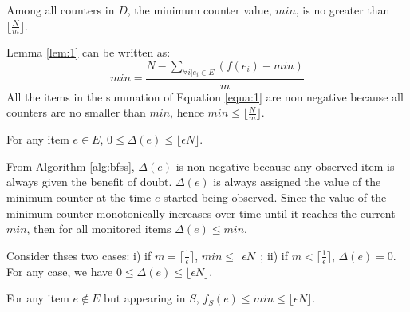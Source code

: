\documentclass[conference]{IEEEtran}
\begin{document}
\begin{lemma} \label{lem:2}
Among all counters in $D$, the minimum counter value, $min$, is no greater than $\lfloor\frac{N}{m}\rfloor$.
\end{lemma}

\begin{IEEEproof}
Lemma \ref{lem:1} can be written as:
\begin{equation}\label{equa:1}
	min=\frac{N-\sum_{\forall i|e_i \in E}(f(e_i)-min)}{m}
\end{equation}
\indent All the items in the summation of Equation \ref{equa:1} are non negative because all counters are no smaller than $min$, hence $min\leq\lfloor \frac{N}{m}\rfloor$.
\end{IEEEproof}

\begin{lemma}\label{lem:3}
	For any item $e \in E$, $0 \leq \Delta(e) \leq \lfloor \epsilon N\rfloor$. 
\end{lemma}

\begin{IEEEproof}
From Algorithm \ref{alg:bfss}, $\Delta(e)$ is non-negative because any observed item is always given the benefit of doubt. $\Delta(e)$ is always assigned the value of the minimum counter at the time $e$ started being observed. Since the value of the minimum counter monotonically increases over time until it reaches the current $min$, then for all monitored items $\Delta(e) \leq min$.\par
Consider thses two cases: i) if $m=\lceil \frac{1}{\epsilon}\rceil$, $min\leq \lfloor \epsilon N\rfloor$; ii) if $m<\lceil \frac{1}{\epsilon}\rceil$, $\Delta(e)=0$. For any case, we have $0 \leq \Delta(e) \leq \lfloor \epsilon N\rfloor$.
\end{IEEEproof}

\begin{lemma}\label{lem:4}
	For any item $e\notin E$ but appearing in $S$, $f_S(e)\leq min\leq \lfloor \epsilon N\rfloor$.
\end{lemma}
\end{document}
